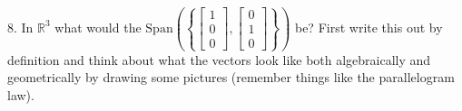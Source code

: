 \documentclass[12pt]{article}
\begin{document}
8. In $\mathbb{R}^3$ what would the $\text{Span}\left (\left \{ \left[ \begin{array}{c} 1  \\ 0  \\ 0\end{array} \right] , \left[ \begin{array}{c} 0  \\ 1  \\ 0\end{array} \right]\right\} \right)$ be?  First write this out by definition and think about what the vectors look like both algebraically and geometrically by drawing some pictures (remember things like the parallelogram law). \\










\end{document}
